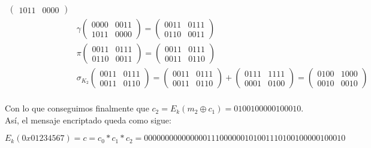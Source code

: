 \documentclass[fleqn]{article}
\begin{document}
\begin{equation*}
\begin{aligned}
\begin{pmatrix}
                1011 & 0000
            \end{pmatrix} \\
            &\gamma \begin{pmatrix}
                0000 & 0011 \\
                1011 & 0000
            \end{pmatrix} =
            \begin{pmatrix}
                0011 & 0111 \\
                0110 & 0011
            \end{pmatrix} \\
            &\pi \begin{pmatrix}
                0011 & 0111 \\
                0110 & 0011
            \end{pmatrix} =
            \begin{pmatrix}
                0011 & 0111 \\
                0011 & 0110
            \end{pmatrix} \\
            &\sigma_{K_2} \begin{pmatrix}
                0011 & 0111 \\
                0011 & 0110
            \end{pmatrix} =
            \begin{pmatrix}
                0011 & 0111 \\
                0011 & 0110
            \end{pmatrix} +
            \begin{pmatrix}
                0111 & 1111 \\
                0001 & 0100
            \end{pmatrix} =
            \begin{pmatrix}
                0100 & 1000 \\
                0010 & 0010
            \end{pmatrix} \\
        \end{aligned}
    \end{equation*}


    Con lo que conseguimos finalmente que $c_2 = E_k(m_2 \oplus c_1) = 0100100000100010$. Así, el mensaje encriptado
    queda como sigue:

    $$E_k(0x01234567) = c = c_0 * c_1 * c_2 = 000000000000000111000000101001110100100000100010$$
\end{document}
